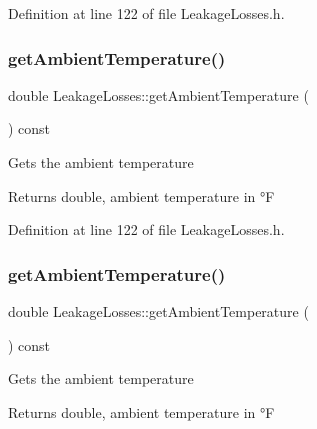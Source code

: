 Definition at line 122 of file Leakage\+Losses.\+h.

\mbox{\label{class_leakage_losses_af67ad0af750484b13dd311c881f71c61}} 
\subsubsection{\texorpdfstring{get\+Ambient\+Temperature()}{getAmbientTemperature()}\hspace{0.1cm}{\footnotesize\ttfamily [2/3]}}
{\footnotesize\ttfamily double Leakage\+Losses\+::get\+Ambient\+Temperature (\begin{DoxyParamCaption}{ }\end{DoxyParamCaption}) const\hspace{0.3cm}{\ttfamily [inline]}}

Gets the ambient temperature

\begin{DoxyReturn}{Returns}
double, ambient temperature in °F 
\end{DoxyReturn}


Definition at line 122 of file Leakage\+Losses.\+h.

\mbox{\label{class_leakage_losses_af67ad0af750484b13dd311c881f71c61}} 
\subsubsection{\texorpdfstring{get\+Ambient\+Temperature()}{getAmbientTemperature()}\hspace{0.1cm}{\footnotesize\ttfamily [3/3]}}
{\footnotesize\ttfamily double Leakage\+Losses\+::get\+Ambient\+Temperature (\begin{DoxyParamCaption}{ }\end{DoxyParamCaption}) const\hspace{0.3cm}{\ttfamily [inline]}}

Gets the ambient temperature

\begin{DoxyReturn}{Returns}
double, ambient temperature in °F 
\end{DoxyReturn}


